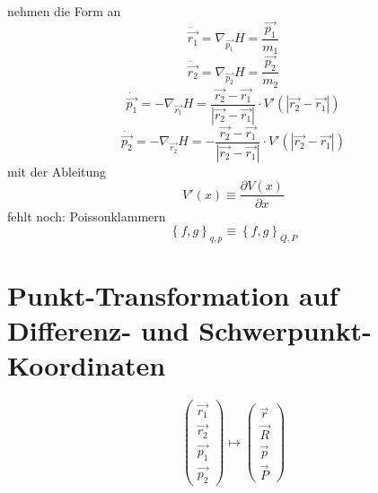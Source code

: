 \documentclass[11pt]{article} %
\begin{document}
nehmen die Form an
\begin{equation} \dot{\vec{r_1}} = \nabla_{\vec{p_1}} H = \frac{\vec{p_1}}{m_1} \end{equation}
\begin{equation} \dot{\vec{r_2}} = \nabla_{\vec{p_2}} H = \frac{\vec{p_2}}{m_2} \end{equation}
\begin{equation} \dot{\vec{p_1}} = - \nabla_{\vec{r_1}} H = \frac{\vec{r_2} - \vec{r_1}}{\left|\vec{r_2} - \vec{r_1}\right|} \cdot V'(\left|\vec{r_2} - \vec{r_1}\right|) \end{equation}
\begin{equation} \dot{\vec{p_2}} = - \nabla_{\vec{r_2}} H = -  \frac{\vec{r_2} - \vec{r_1}}{\left|\vec{r_2} - \vec{r_1}\right|} \cdot V'(\left|\vec{r_2} - \vec{r_1}\right|) \end{equation}
mit der Ableitung
\begin{equation} V'(x) \equiv \frac{\partial V(x)}{\partial x} \end{equation}
fehlt noch: Poissonklammern
\begin{equation}
\left\{f,g\right\}_{q,p}\equiv \left\{f,g\right\}_{Q,P}
\end{equation}

\section{Punkt-Transformation auf Differenz- und Schwerpunkt-Koordinaten}
\begin{equation}
\begin{pmatrix}
\vec{r_1} \\ \vec{r_2} \\ \vec{p_1} \\ \vec{p_2}
\end{pmatrix}
\mapsto
\begin{pmatrix}
\vec{r} \\ \vec{R} \\ \vec{p} \\ \vec{P}
\end{pmatrix}
\end{equation}
\end{document}
